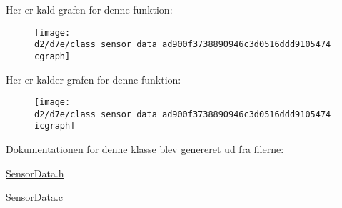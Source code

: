 Her er kald-\/grafen for denne funktion\+:\nopagebreak
\begin{figure}[H]
\begin{center}
\leavevmode
\texttt{[image: d2/d7e/class\_sensor\_data\_ad900f3738890946c3d0516ddd9105474\_cgraph]}
\end{center}
\end{figure}




Her er kalder-\/grafen for denne funktion\+:\nopagebreak
\begin{figure}[H]
\begin{center}
\leavevmode
\texttt{[image: d2/d7e/class\_sensor\_data\_ad900f3738890946c3d0516ddd9105474\_icgraph]}
\end{center}
\end{figure}




Dokumentationen for denne klasse blev genereret ud fra filerne\+:\begin{DoxyCompactItemize}
\item 
\hyperlink{_sensor_data_8h}{Sensor\+Data.\+h}\item 
\hyperlink{_sensor_data_8c}{Sensor\+Data.\+c}\end{DoxyCompactItemize}
